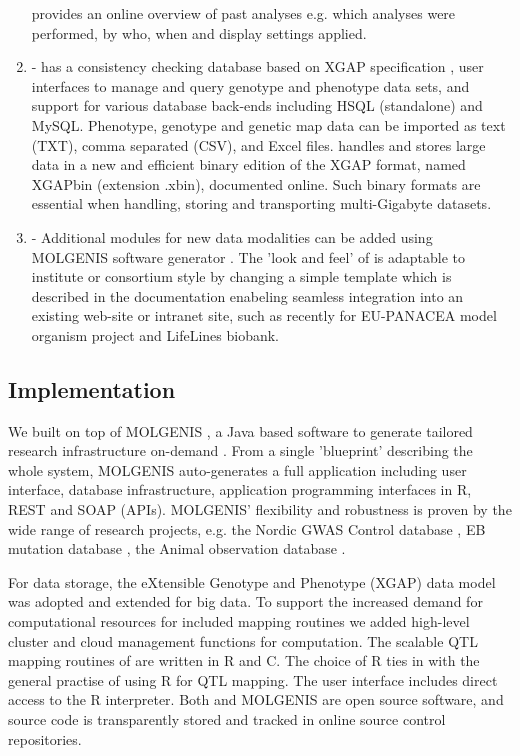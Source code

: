 \begin{enumerate}
\xqtlwb provides an online overview of past analyses e.g. which analyses were performed, by who, when 
and display settings applied.
\item {} - \xqtlwb has a consistency checking database based on XGAP 
specification \cite{Swertz:2010a}, user interfaces to manage and query genotype and phenotype data 
sets, and support for various database back-ends including HSQL (standalone) and MySQL. Phenotype, 
genotype and genetic map data can be imported as text (TXT), comma separated (CSV), and Excel files. 
\xqtlwb handles and stores large data in a new and efficient binary edition of the XGAP format, named 
XGAPbin (extension .xbin), documented online. Such binary formats are essential when handling, storing 
and transporting multi-Gigabyte datasets.
\item {} - Additional modules for new data modalities can be added using 
MOLGENIS software generator \cite{Swertz:2010b}. The 'look and feel' of \xqtlwb is adaptable to 
institute or consortium style by changing a simple template which is described in the \xqtlwb 
documentation enabeling seamless integration into an existing web-site or intranet site, such as 
recently for EU-PANACEA model organism project and LifeLines biobank.
\end{enumerate}

\subsection{Implementation}
We built \xqtlwb on top of MOLGENIS \cite{Swertz:2004}, a Java based software to generate tailored 
research infrastructure on-demand \cite{Swertz:2007}. From a single 'blueprint' describing the whole 
system, MOLGENIS auto-generates a full application including user interface, database infrastructure, 
application programming interfaces in R, REST and SOAP (APIs). MOLGENIS' flexibility and robustness 
is proven by the wide range of research projects, e.g. the Nordic GWAS Control database \cite{Leu:2010}, 
EB mutation database \cite{Akker:2011}, the Animal observation database \cite{Swertz:2010b}.

For data storage, the eXtensible Genotype and Phenotype (XGAP) data model was adopted \cite{Swertz:2010a} 
and extended for big data. To support the increased demand for computational resources for included 
mapping routines we added high-level cluster and cloud management functions for computation. The 
scalable QTL mapping routines of \xqtlwb are written in R and C. The choice of R ties in with the 
general practise of using R for QTL mapping. The user interface includes direct access to the R 
interpreter. Both \xqtlwb and MOLGENIS are open source software, and source code is transparently
stored and tracked in online source control repositories.

